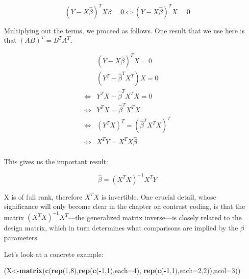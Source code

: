 \documentclass[12pt,]{krantz}
\newenvironment{Shaded}{\begin{snugshade}}{\end{snugshade}}
\newcommand{\DataTypeTok}[1]{\textcolor[rgb]{0.13,0.29,0.53}{#1}}
\newcommand{\DecValTok}[1]{\textcolor[rgb]{0.00,0.00,0.81}{#1}}
\newcommand{\KeywordTok}[1]{\textcolor[rgb]{0.13,0.29,0.53}{\textbf{#1}}}
\newcommand{\NormalTok}[1]{#1}
\newcommand{\OperatorTok}[1]{\textcolor[rgb]{0.81,0.36,0.00}{\textbf{#1}}}
\begin{document}
\begin{equation}
(Y- X\hat\beta)^T X \beta = 0 \Leftrightarrow (Y- X\hat\beta)^T X = 0 
\end{equation}

Multiplying out the terms, we proceed as follows. One result that we use here is that \((AB)^T = B^T A^T\).

\begin{equation}
\begin{split}
~& (Y- X\hat\beta)^T X = 0  \\
~& (Y^T- \hat\beta^T X^T)X = 0\\
\Leftrightarrow& Y^T X - \hat\beta^TX^T X = 0 \quad  \\
\Leftrightarrow& Y^T X = \hat\beta^TX^T X \\
\Leftrightarrow& (Y^T X)^T = (\hat\beta^TX^T X)^T \\
\Leftrightarrow& X^T Y = X^TX\hat\beta\\
\end{split}
\end{equation}

This gives us the important result:

\begin{equation}
\hat\beta = (X^TX)^{-1}X^T Y
\end{equation}

X is of full rank, therefore \(X^TX\) is invertible. One crucial detail, whose significance will only become clear in the chapter on contrast coding, is that the matrix \((X^TX)^{-1}X^T\)---the generalized matrix inverse---is closely related to the design matrix, which in turn determines what comparisons are implied by the \(\beta\) parameters.

Let's look at a concrete example:

\begin{Shaded}
\begin{Highlighting}[]
\NormalTok{(X<-}\KeywordTok{matrix}\NormalTok{(}\KeywordTok{c}\NormalTok{(}\KeywordTok{rep}\NormalTok{(}\DecValTok{1}\NormalTok{,}\DecValTok{8}\NormalTok{),}\KeywordTok{rep}\NormalTok{(}\KeywordTok{c}\NormalTok{(}\OperatorTok{-}\DecValTok{1}\NormalTok{,}\DecValTok{1}\NormalTok{),}\DataTypeTok{each=}\DecValTok{4}\NormalTok{),}
            \KeywordTok{rep}\NormalTok{(}\KeywordTok{c}\NormalTok{(}\OperatorTok{-}\DecValTok{1}\NormalTok{,}\DecValTok{1}\NormalTok{),}\DataTypeTok{each=}\DecValTok{2}\NormalTok{,}\DecValTok{2}\NormalTok{)),}\DataTypeTok{ncol=}\DecValTok{3}\NormalTok{))}
\end{Highlighting}
\end{Shaded}
\end{document}
